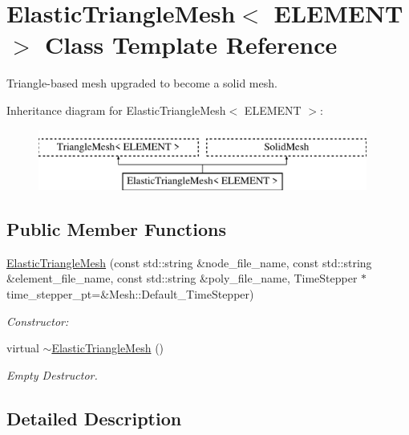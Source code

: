 \hypertarget{classElasticTriangleMesh}{}\section{Elastic\+Triangle\+Mesh$<$ E\+L\+E\+M\+E\+NT $>$ Class Template Reference}
\label{classElasticTriangleMesh}


Triangle-\/based mesh upgraded to become a solid mesh.  


Inheritance diagram for Elastic\+Triangle\+Mesh$<$ E\+L\+E\+M\+E\+NT $>$\+:\begin{figure}[H]
\begin{center}
\leavevmode
\includegraphics[height=2.000000cm]{classElasticTriangleMesh}
\end{center}
\end{figure}
\subsection*{Public Member Functions}
\begin{DoxyCompactItemize}
\item 
\hyperlink{classElasticTriangleMesh_a4c24e9abbde344d34e1e08fb3319d7b6}{Elastic\+Triangle\+Mesh} (const std\+::string \&node\+\_\+file\+\_\+name, const std\+::string \&element\+\_\+file\+\_\+name, const std\+::string \&poly\+\_\+file\+\_\+name, Time\+Stepper $\ast$time\+\_\+stepper\+\_\+pt=\&Mesh\+::\+Default\+\_\+\+Time\+Stepper)
\begin{DoxyCompactList}\small\item\em Constructor\+: \end{DoxyCompactList}\item 
virtual \hyperlink{classElasticTriangleMesh_ade80b912f1bb791e5f4fac35abf90504}{$\sim$\+Elastic\+Triangle\+Mesh} ()
\begin{DoxyCompactList}\small\item\em Empty Destructor. \end{DoxyCompactList}\end{DoxyCompactItemize}


\subsection{Detailed Description}
